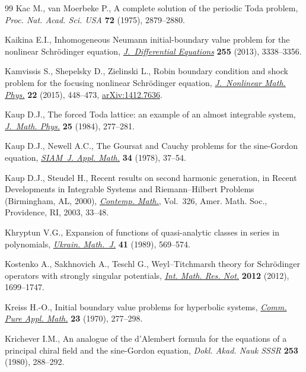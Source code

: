 \documentclass[pdftex]{sigma}
\numberwithin{equation}{section}
\begin{document}
\begin{thebibliography}{99}
Kac M., van Moerbeke P., A complete solution of the periodic {T}oda problem,
 \textit{Proc. Nat. Acad. Sci. USA} \textbf{72} (1975), 2879--2880.

Kaikina E.I., Inhomogeneous {N}eumann initial-boundary value problem for the
 nonlinear {S}chr\"odinger equation, \href{http://dx.doi.org/10.1016/j.jde.2013.07.036}{\textit{J.~Differential Equations}}
 \textbf{255} (2013), 3338--3356.

Kamvissis S., Shepelsky D., Zielinski L., Robin boundary condition and shock
 problem for the focusing nonlinear {S}chr\"odinger equation,
 \href{http://dx.doi.org/10.1080/14029251.2015.1079428}{\textit{J.~Nonlinear Math. Phys.}} \textbf{22} (2015), 448--473,
 \href{http://arxiv.org/abs/1412.7636}{arXiv:1412.7636}.

Kaup D.J., The forced {T}oda lattice: an example of an almost integrable
 system, \href{http://dx.doi.org/10.1063/1.526136}{\textit{J.~Math. Phys.}} \textbf{25} (1984), 277--281.

Kaup D.J., Newell A.C., The {G}oursat and {C}auchy problems for the
 sine-{G}ordon equation, \href{http://dx.doi.org/10.1137/0134004}{\textit{SIAM~J. Appl. Math.}} \textbf{34} (1978),
 37--54.

Kaup D.J., Steudel H., Recent results on second harmonic generation, in Recent
 Developments in Integrable Systems and {R}iemann--{H}ilbert Problems
 ({B}irmingham, {AL}, 2000), \href{http://dx.doi.org/10.1090/conm/326/05755}{\textit{Contemp. Math.}}, Vol.~326, Amer. Math.
 Soc., Providence, RI, 2003, 33--48.

Khryptun V.G., Expansion of functions of quasi-analytic classes in series in
 polynomials, \href{http://dx.doi.org/10.1007/BF01060545}{\textit{Ukrain. Math.~J.}} \textbf{41} (1989), 569--574.

Kostenko A., Sakhnovich A., Teschl G., Weyl--{T}itchmarsh theory for
 {S}chr\"odinger operators with strongly singular potentials, \href{http://dx.doi.org/10.1093/imrn/rnr065}{\textit{Int.
 Math. Res. Not.}} \textbf{2012} (2012), 1699--1747.

Kreiss H.-O., Initial boundary value problems for hyperbolic systems,
 \href{http://dx.doi.org/10.1002/cpa.3160230304}{\textit{Comm. Pure Appl. Math.}} \textbf{23} (1970), 277--298.

Krichever I.M., An analogue of the d'{A}lembert formula for the equations of a
 principal chiral f\/ield and the sine-{G}ordon equation, \textit{Dokl. Akad.
 Nauk SSSR} \textbf{253} (1980), 288--292.


\end{thebibliography}
\end{document}
